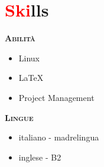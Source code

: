 \section*{\textcolor{red}{Ski}lls}
\begin{multicols}{2}
    \large{\textbf{\textsc{Abilità}}}
    \begin{itemize}
        \item Linux
        \item \LaTeX
        \item Project Management
    \end{itemize}
    \large{\textbf{\textsc{Lingue}}}
    \begin{itemize}
        \item italiano - madrelingua
        \item inglese - B2
    \end{itemize}
\end{multicols}
